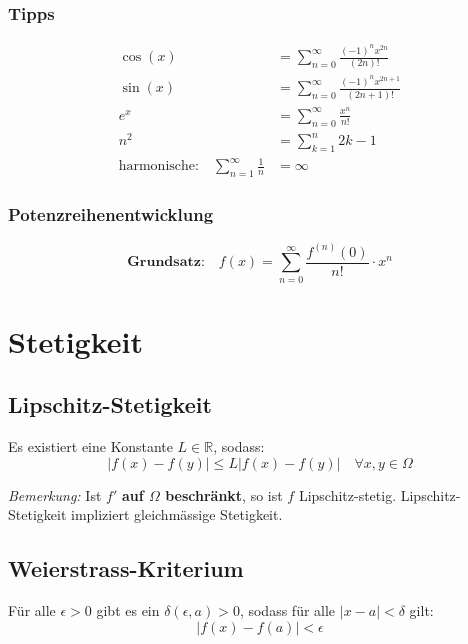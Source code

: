 \documentclass[11pt]{article}
\begin{document}
\subsubsection{Tipps}
\begin{equation*}
\begin{split}
	\cos(x) & = \sum^\infty_{n =0}\frac{(-1)^nx^{2n}}{(2n)!} \\
	\sin(x) & = \sum^\infty_{n =0}\frac{(-1)^nx^{2n+1}}{(2n+1)!} \\
	e^x & = \sum^\infty_{n =0}\frac{x^n}{n!} \\
	n^2 & = \sum_{k=1}^n 2k-1\\
	\text{harmonische:} \quad \sum_{n=1}^{\infty}\frac{1}{n} & = \infty
\end{split}
\end{equation*}

\subsubsection{Potenzreihenentwicklung}

\begin{equation*}
	\textbf{Grundsatz:} \quad f(x) = \sum_{n=0}^\infty \frac{f^{(n)}(0)}{n!} \cdot x^n
\end{equation*}

\section{Stetigkeit}

\subsection{Lipschitz-Stetigkeit}
Es existiert eine Konstante $L\in \mathbb{R}$, sodass:
\begin{equation*}
	|f(x)-f(y)|\leq L|f(x)-f(y)| \quad \forall x,y \in \Omega
\end{equation*}

\emph{Bemerkung:} Ist $f'$ \textbf{auf $\Omega$ beschr{\"a}nkt}, so ist $f$ Lipschitz-stetig. Lipschitz-Stetigkeit impliziert gleichm{\"a}ssige Stetigkeit.

\subsection{Weierstrass-Kriterium}
F{\"u}r alle $\epsilon > 0$ gibt es ein $\delta(\epsilon, a) >0$, sodass f{\"u}r alle $|x-a|<\delta$ gilt:
\begin{equation*}
	|f(x) -f(a)|<\epsilon
\end{equation*}
\end{document}
